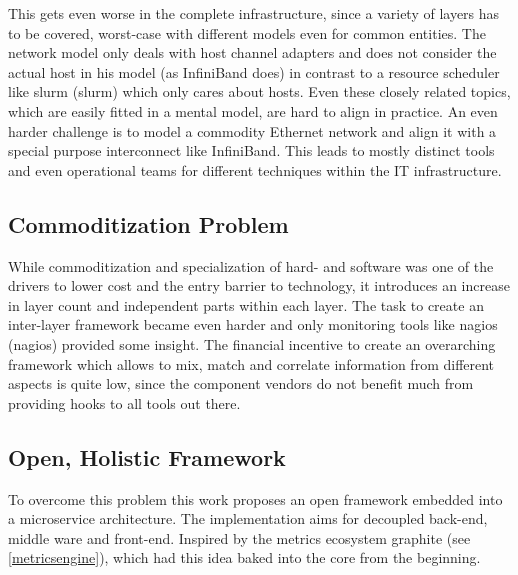 This gets even worse in the complete infrastructure, since a variety of layers has to be covered, worst-case with different models even for common entities.
The network model only deals with host channel adapters and does not consider the actual host in his model (as InfiniBand does) in contrast to a resource
scheduler like \gls{slurm} (\glsdesc{slurm}) which only cares about hosts. Even these closely related topics, which are easily fitted
in a mental model, are hard to align in practice. An even harder challenge is to model a commodity Ethernet network and align it with a special purpose interconnect like InfiniBand.
This leads to mostly distinct tools and even operational teams for different techniques within the IT infrastructure.

\subsection{Commoditization Problem}
While commoditization and specialization of hard- and software was one of the drivers to lower cost and the entry barrier to technology, it
introduces an increase in layer count and
independent parts within each layer. The task to create an inter-layer framework became even harder and only monitoring tools like \gls{nagios} (\glsdesc{nagios}) provided some insight.
The financial incentive to create an overarching framework which allows to mix, match and correlate information from different aspects is quite low, since the component vendors
do not benefit much from providing hooks to all tools out there.

\subsection{Open, Holistic Framework}
To overcome this problem this work proposes an open framework embedded into a microservice architecture. The implementation aims for decoupled back-end, middle ware and front-end.
Inspired by the metrics ecosystem \gls{graphite} (see \ref{metricsengine}), which had this idea baked into the core from the beginning.

